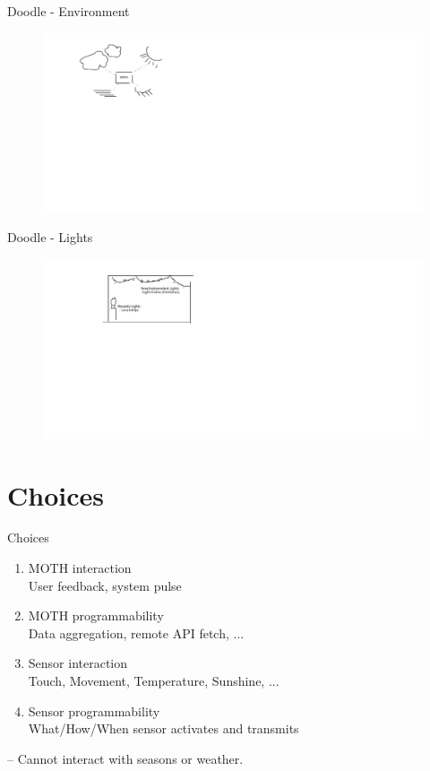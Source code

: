 \documentclass{beamer}
\begin{document}
    \begin{frame}{Doodle - Environment}
        \begin{figure}[H]
            \centering
            \includegraphics[width=2.25\textwidth]{Drawing_MOTH_Environment.png}
            \label{fig:Drawing_MOTH_Environment}
        \end{figure}
    \end{frame}

    \begin{frame}{Doodle - Lights}
        \begin{figure}[H]
            \centering
            \includegraphics[width=2.25\textwidth]{Drawing_Lights.png}
            \label{fig:Drawing_Lights}
        \end{figure}
    \end{frame}

    \section{Choices}
    \begin{frame}{Choices}
        \begin{enumerate}
            \item MOTH interaction\\User feedback, system pulse
            \item MOTH programmability\\Data aggregation, remote API fetch, ...
            \item Sensor interaction\\Touch, Movement, Temperature, Sunshine, ...
            \item Sensor programmability\\What/How/When sensor activates and transmits
        \end{enumerate}
        -- Cannot interact with seasons or weather.
    \end{frame}
\end{document}
